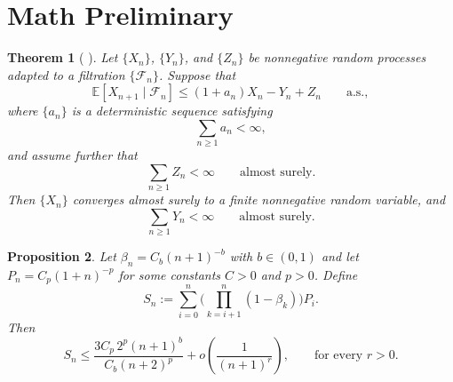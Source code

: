 \documentclass{article}
\newtheorem{theorem}{Theorem}[section]
\newtheorem{proposition}[theorem]{Proposition}
\begin{document}

























\newpage

\appendix

\section{Math Preliminary}
\begin{theorem}[ {\cite{robbins1971convergence}}]
\label{Robbins Siegmund}
Let $\{X_n\}$, $\{Y_n\}$, and $\{Z_n\}$ be nonnegative random processes adapted to
a filtration $\{\mathcal{F}_n\}$. Suppose that
\[
    \mathbb{E}[X_{n+1} \mid \mathcal{F}_n]
    \le
    (1 + a_n) X_n - Y_n + Z_n
    \qquad \text{a.s.},
\]
where $\{a_n\}$ is a deterministic sequence satisfying
\[
    \sum_{n \ge 1} a_n < \infty,
\]
and assume further that
\[
    \sum_{n \ge 1} Z_n < \infty
    \qquad \text{almost surely}.
\]
Then $\{X_n\}$ converges almost surely to a finite nonnegative random variable,
and
\[
    \sum_{n \ge 1} Y_n < \infty
    \qquad \text{almost surely}.
\]
\end{theorem}


\begin{proposition}
\label{prop:Sn_bound}
Let $\beta_n = C_b(n+1)^{-b}$ with $b \in (0,1)$ and let
$P_n = C_p(1+n)^{-p}$ for some constants $C>0$ and $p>0$. Define
\[
    S_n
    :=
    \sum_{i=0}^{n}
    \Bigg(
        \prod_{k=i+1}^{n} (1-\beta_k)
    \Bigg) P_i .
\]
Then
\begin{equation}
\label{eq:Sn_final}
    S_n
    \le
    \frac{3 C_p\,2^p (n+1)^b}{C_b (n+2)^p}
    + o\!\left(\frac{1}{(n+1)^r}\right),
    \qquad \text{for every } r>0 .
\end{equation}
\label{Prop:Bigo}
\end{proposition}
\end{document}

